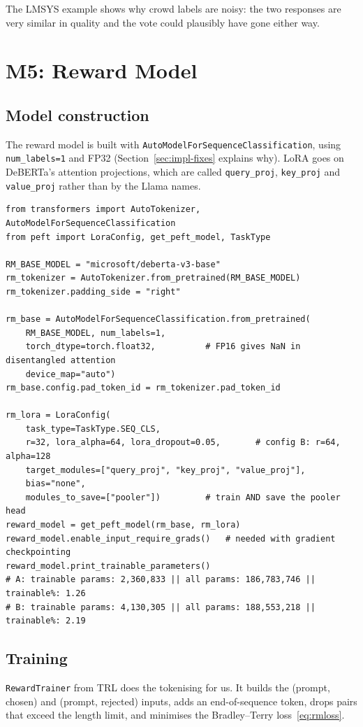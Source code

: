 The LMSYS example shows why crowd labels are noisy: the two responses are very similar in quality and the vote could plausibly have gone either way.

\section{M5: Reward Model}
\label{sec:m5}

\subsection{Model construction}
The reward model is built with \texttt{AutoModelForSequenceClassification}, using \texttt{num\_labels=1} and FP32 (Section~\ref{sec:impl-fixes} explains why). LoRA goes on DeBERTa's attention projections, which are called \texttt{query\_proj}, \texttt{key\_proj} and \texttt{value\_proj} rather than by the Llama names.

\begin{lstlisting}[caption={Building the DeBERTa-v3 reward model with LoRA (configuration A).}, label={lst:rmbuild}]
from transformers import AutoTokenizer, AutoModelForSequenceClassification
from peft import LoraConfig, get_peft_model, TaskType

RM_BASE_MODEL = "microsoft/deberta-v3-base"
rm_tokenizer = AutoTokenizer.from_pretrained(RM_BASE_MODEL)
rm_tokenizer.padding_side = "right"

rm_base = AutoModelForSequenceClassification.from_pretrained(
    RM_BASE_MODEL, num_labels=1,
    torch_dtype=torch.float32,          # FP16 gives NaN in disentangled attention
    device_map="auto")
rm_base.config.pad_token_id = rm_tokenizer.pad_token_id

rm_lora = LoraConfig(
    task_type=TaskType.SEQ_CLS,
    r=32, lora_alpha=64, lora_dropout=0.05,       # config B: r=64, alpha=128
    target_modules=["query_proj", "key_proj", "value_proj"],
    bias="none",
    modules_to_save=["pooler"])         # train AND save the pooler head
reward_model = get_peft_model(rm_base, rm_lora)
reward_model.enable_input_require_grads()   # needed with gradient checkpointing
reward_model.print_trainable_parameters()
# A: trainable params: 2,360,833 || all params: 186,783,746 || trainable%: 1.26
# B: trainable params: 4,130,305 || all params: 188,553,218 || trainable%: 2.19
\end{lstlisting}

\subsection{Training}
\texttt{RewardTrainer} from TRL does the tokenising for us. It builds the (prompt, chosen) and (prompt, rejected) inputs, adds an end-of-sequence token, drops pairs that exceed the length limit, and minimises the Bradley--Terry loss~\eqref{eq:rmloss}.

